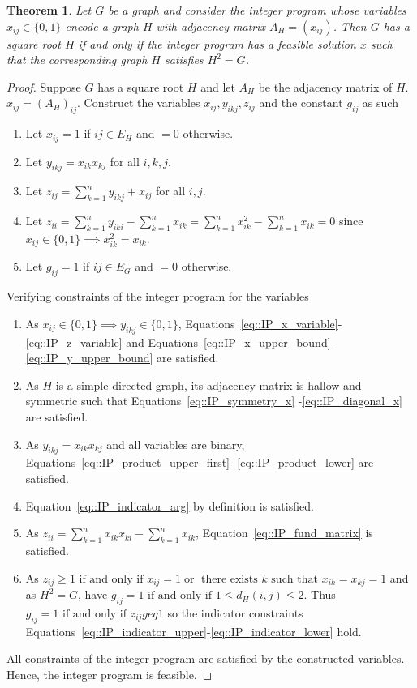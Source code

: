 \documentclass[11pt]{article}
\newtheorem{theorem}{Theorem}
\begin{document}
\begin{theorem} \label{theorem::IP_gives_root}
Let $G$ be a graph and consider the integer program whose variables $x_{ij} \in \{0,1\}$ encode a graph $H$ with adjacency matrix $A_H = (x_{ij})$. Then $G$ has a square root $H$ if and only if the integer  program has a feasible solution $x$ such that the corresponding graph $H$ satisfies $H^2 = G$.
\end{theorem}
\begin{proof}
  Suppose $G$ has a square root $H$ and let $A_H$ be the adjacency matrix of $H$.  $x_{ij} = (A_H)_{ij}$. Construct the variables $x_{ij}, y_{ikj}, z_{ij}$ and the constant $g_{ij}$ as such 
  \begin{enumerate}[label=\roman*)]
    \item Let $x_{ij} = 1$ if $ij \in E_H$ and $=0$ otherwise. 
    \item Let $y_{ikj} = x_{ik}x_{kj}$ for all $i,k,j$. 
    \item Let $\displaystyle z_{ij} = \sum_{k = 1}^{n} y_{ikj} + x_{ij} $ for all $i,j$. 
    \item Let $\displaystyle z_{ii} = \sum_{k  = 1}^{n} y_{iki} - \sum_{k = 1}^{n} x_{ik} =  \sum_{k = 1}^{n} x_{ik}^2 -  \sum_{k = 1}^{n} x_{ik} = 0 $
    since $x_{ij} \in \{0 , 1\} \implies x_{ik}^2 = x_{ik}$. 
    \item Let $g_{ij} = 1$ if $ij \in E_G$ and $=0$ otherwise. 
  \end{enumerate}
  Verifying constraints of the integer program for the variables 
  \begin{enumerate}[label=\roman*)]
    \item As $x_{ij} \in \{0, 1 \} \implies y_{ikj}  \in \{0, 1 \} $, Equations~\eqref{eq::IP_x_variable}-\eqref{eq::IP_z_variable}
    and Equations~\eqref{eq::IP_x_upper_bound}-\eqref{eq::IP_y_upper_bound} are satisfied.  
    \item As $H$ is a simple directed graph, its adjacency matrix is hallow and symmetric such that Equations~\eqref{eq::IP_symmetry_x}
    -\eqref{eq::IP_diagonal_x} are satisfied.  
    \item As $y_{ikj} = x_{ik}x_{kj}$ and all variables are binary, Equations~\eqref{eq::IP_product_upper_first}-
    \eqref{eq::IP_product_lower} are satisfied. 
    \item Equation~\eqref{eq::IP_indicator_arg} by definition is satisfied. 
    \item As $\displaystyle z_{ii} = \sum_{k = 1}^{n} x_{ik}x_{ki} - \sum_{k = 1}^{n} x_{ik}$, Equation~\eqref{eq::IP_fund_matrix} is satisfied. 
    \item As $\displaystyle z_{ij} \geq 1 \text{ if and only if } x_{ij} = 1 \; \text{or} \; \text{ there exists } k \text{ such that } x_{ik}=x_{kj}= 1$ and as $H^2 = G$,
    have $g_{ij} = 1 \text{ if and only if } 1 \leq d_H(i,j) \leq 2$. Thus $g_{ij} = 1 \text{ if and only if } z_{ij}geq 1$ so the indicator 
    constraints Equations~\eqref{eq::IP_indicator_upper}-\eqref{eq::IP_indicator_lower} hold. 
  \end{enumerate}
  All constraints of the integer program are satisfied by the constructed variables. Hence, the integer program is feasible.


\end{proof}
\end{document}
